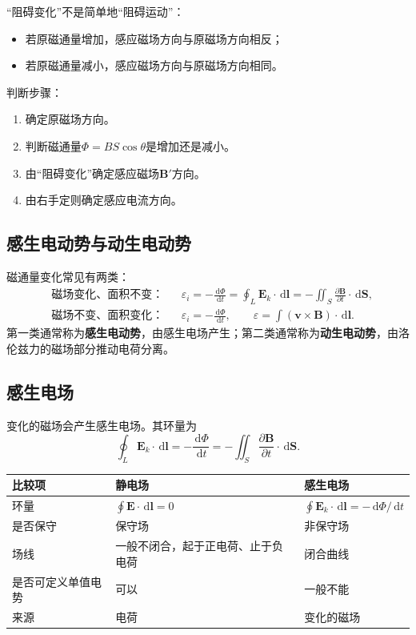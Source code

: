 \documentclass[UTF8,zihao=-4]{ctexart}
\newcommand{\dd}{\,\mathrm d}
\newcommand{\eps}{\varepsilon}
\newcommand{\ve}[1]{\bm{#1}}
\newcommand{\E}{\ve E}
\newcommand{\B}{\ve B}
\newcommand{\dl}{\dd\ve l}
\newcommand{\dS}{\dd\ve S}
\begin{document}
“阻碍变化”不是简单地“阻碍运动”：
\begin{itemize}
  \item 若原磁通量增加，感应磁场方向与原磁场方向相反；
  \item 若原磁通量减小，感应磁场方向与原磁场方向相同。
\end{itemize}
判断步骤：
\begin{enumerate}
  \item 确定原磁场方向。
  \item 判断磁通量\(\Phi=BS\cos\theta\)是增加还是减小。
  \item 由“阻碍变化”确定感应磁场\(\B'\)方向。
  \item 由右手定则确定感应电流方向。
\end{enumerate}

\subsection{感生电动势与动生电动势}

磁通量变化常见有两类：
\begin{align*}
&\text{磁场变化、面积不变：} &&\eps_i=-\frac{\dd\Phi}{\dd t}=\oint_L \E_k\cdot\dl=-\iint_S\frac{\partial\B}{\partial t}\cdot\dS, \\
&\text{磁场不变、面积变化：} &&\eps_i=-\frac{\dd\Phi}{\dd t},\qquad \eps=\int(\ve v\times\B)\cdot\dl.
\end{align*}
第一类通常称为\textbf{感生电动势}，由感生电场产生；第二类通常称为\textbf{动生电动势}，由洛伦兹力的磁场部分推动电荷分离。

\subsection{感生电场}

变化的磁场会产生感生电场。其环量为
\begin{equation}
\boxed{\oint_L \E_k\cdot\dl=-\frac{\dd\Phi}{\dd t}=-\iint_S\frac{\partial\B}{\partial t}\cdot\dS}.
\end{equation}

\begin{warnbox}[静电场与感生电场的区别]
\begin{center}
\begin{tabular}{lll}
\toprule
\textbf{比较项} & \textbf{静电场} & \textbf{感生电场} \\
\midrule
环量 & \(\oint\E\cdot\dl=0\) & \(\oint\E_k\cdot\dl=-\dd\Phi/\dd t\) \\
是否保守 & 保守场 & 非保守场 \\
场线 & 一般不闭合，起于正电荷、止于负电荷 & 闭合曲线 \\
是否可定义单值电势 & 可以 & 一般不能 \\
来源 & 电荷 & 变化的磁场 \\
\bottomrule
\end{tabular}
\end{center}
\end{warnbox}
\end{document}
